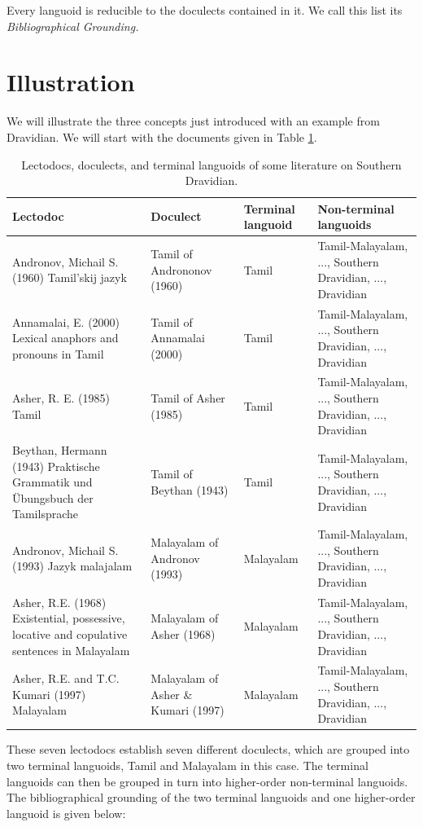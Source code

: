 \documentclass[a4paper,10pt]{article}
\begin{document}
Every languoid is reducible to the doculects contained in it. We call this list its \em Bibliographical Grounding\em.

\section{Illustration}
We will illustrate the three concepts just introduced with an example from Dravidian. We will start with the documents given in Table \ref{tab:dravidiandocs}.

\begin{table}
\begin{tabular}{p{5cm}p{2cm}p{2cm}p{4cm}}
Lectodoc & Doculect & Terminal languoid & Non-terminal languoids\\ 
\hline
Andronov, Michail S.  (1960) Tamil'skij jazyk & Tamil of Andrononov (1960)& Tamil & Tamil-Malayalam, ...,  Southern Dravidian, ..., Dravidian\\
Annamalai, E.  (2000) Lexical anaphors and pronouns in Tamil & Tamil of Annamalai (2000)& Tamil& Tamil-Malayalam, ...,  Southern Dravidian, ..., Dravidian\\
Asher, R. E.  (1985) Tamil & Tamil of Asher (1985)& Tamil& Tamil-Malayalam, ...,  Southern Dravidian, ..., Dravidian\\
Beythan, Hermann  (1943) Praktische Grammatik und Übungsbuch der Tamilsprache & Tamil of Beythan (1943)& Tamil& Tamil-Malayalam, ...,  Southern Dravidian, ..., Dravidian\\
\hline
Andronov, Michail S.  (1993)  Jazyk malajalam  & Malayalam of Andronov (1993) & Malayalam& Tamil-Malayalam, ...,  Southern Dravidian, ..., Dravidian\\
Asher, R.E.  (1968) Existential, possessive, locative and copulative sentences in Malayalam & Malayalam of Asher (1968)& Malayalam & Tamil-Malayalam, ...,  Southern Dravidian, ..., Dravidian\\
Asher, R.E. and T.C. Kumari  (1997) Malayalam & Malayalam of Asher \& Kumari (1997) & Malayalam& Tamil-Malayalam, ...,  Southern Dravidian, ..., Dravidian\\
\end{tabular}
\caption{Lectodocs, doculects, and terminal languoids of some literature on Southern Dravidian.}
\label{tab:dravidiandocs}
\end{table}

These seven lectodocs establish seven different doculects, which are grouped into two terminal languoids, Tamil and Malayalam in this case. The terminal languoids can then be grouped in turn into higher-order non-terminal languoids. The bibliographical grounding of the two terminal languoids and one higher-order languoid is given below:
\end{document}
